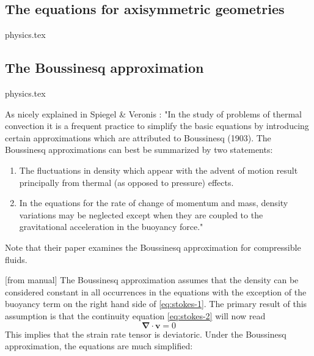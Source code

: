 
\subsection{The equations for axisymmetric geometries \label{ss:axicyleqs}}
\begin{flushright} {\tiny {\color{gray} physics.tex}} \end{flushright}



\newpage
\subsection{The Boussinesq approximation}
\begin{flushright} {\tiny {\color{gray} physics.tex}} \end{flushright}

As nicely explained in Spiegel \& Veronis \cite{spve60}: "In the study of problems of thermal convection it is a frequent practice to simplify the basic equations by introducing certain approximations which are attributed to
Boussinesq (1903). The Boussinesq approximations can best be summarized by two
statements: 
\begin{enumerate}
\item The fluctuations in density which appear with the advent of motion
result principally from thermal (as opposed to pressure) effects. 
\item In the equations
for the rate of change of momentum and mass, density variations may be neglected except
when they are coupled to the gravitational acceleration in the buoyancy force."
\end{enumerate}
Note that their paper examines the Boussinesq approximation for compressible fluids.  

[from \aspect{} manual]
The Boussinesq approximation assumes that the density can be
considered constant in all occurrences in the equations with the exception of
the buoyancy term on the right hand side of \eqref{eq:stokes-1}. The primary
result of this assumption is that the continuity equation \eqref{eq:stokes-2}
will now read
\[
{\bm \nabla}\cdot{\bm v} = 0
\]
This implies that the strain rate tensor is deviatoric.
Under the Boussinesq approximation, the equations are much simplified:

